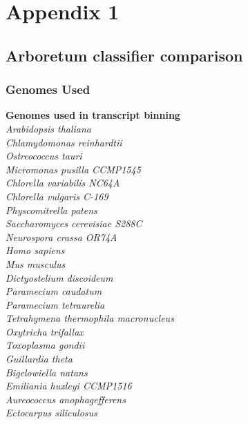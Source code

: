 \graphicspath{{appendices/appendix_1/figures}}
\chapter{Appendix 1}

\section{Arboretum classifier comparison}

\subsection{Genomes Used}
\begin{table}
\begin{longtable}
		\hline 
		\textbf{Genomes used in transcript binning}\\
		\hline
		\textit{Arabidopsis thaliana} \\
		\textit{Chlamydomonas reinhardtii} \\
		\textit{Ostreococcus tauri} \\
		\textit{Micromonas pusilla CCMP1545} \\  
		\textit{Chlorella variabilis NC64A} \\
		\textit{Chlorella vulgaris C-169} \\
		\textit{Physcomitrella patens} \\
		\textit{Saccharomyces cerevisiae S288C} \\ 
		\textit{Neurospora crassa OR74A}\\
		\textit{Homo sapiens}\\
		\textit{Mus musculus}\\
		\textit{Dictyostelium discoideum}\\
		\textit{Paramecium caudatum}\\
		\textit{Paramecium tetraurelia}\\
		\textit{Tetrahymena thermophila macronucleus}\\
		\textit{Oxytricha trifallax}\\
		\textit{Toxoplasma gondii}\\
		\textit{Guillardia theta}\\
		\textit{Bigelowiella natans}\\
		\textit{Emiliania huxleyi CCMP1516}\\
		\textit{Aureococcus anophagefferens}\\
		\textit{Ectocarpus siliculosus}\\

\end{longtable}
\end{table}
